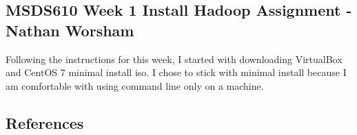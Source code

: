 \documentclass[10pt]{article}
\begin{document}
\subsection*{MSDS610 Week 1 Install Hadoop Assignment - Nathan Worsham}
Following the instructions for this week, I started with downloading VirtualBox and CentOS 7 minimal install iso. I chose to stick with minimal install because I am comfortable with using command line only on a machine. 

\subsection*{References}
\end{document}
